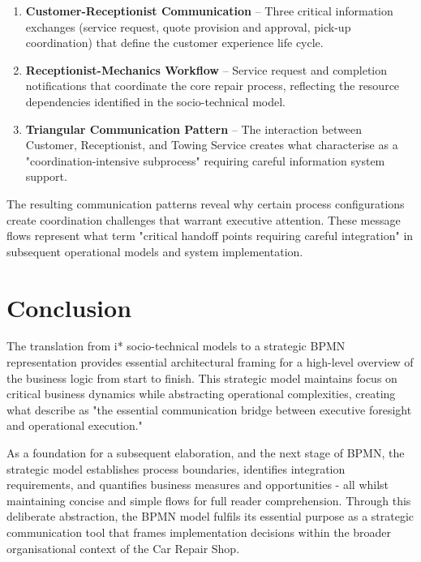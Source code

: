 \documentclass[14pt,a4paper]{article}
\begin{document}
\begin{enumerate}
    \item \textbf{Customer-Receptionist Communication} – Three critical information exchanges (service request, quote provision and approval, pick-up coordination) that define the customer experience life cycle.

    \item \textbf{Receptionist-Mechanics Workflow} – Service request and completion notifications that coordinate the core repair process, reflecting the resource dependencies identified in the socio-technical model.

    \item \textbf{Triangular Communication Pattern} – The interaction between Customer, Receptionist, and Towing Service creates what \textit{\parencite{Corradini2018}} characterise as a "coordination-intensive subprocess" requiring careful information system support.
\end{enumerate}

The resulting communication patterns reveal why certain process configurations create coordination challenges that warrant executive attention. These message flows represent what \textit{\parencite[p. 195]{Delgado2020}} term "critical handoff points requiring careful integration" in subsequent operational models and system implementation.

\section{Conclusion}

The translation from i* socio-technical models to a strategic BPMN representation provides essential architectural framing for a high-level overview of the business logic from start to finish. This strategic model maintains focus on critical business dynamics while abstracting operational complexities, creating what \textit{\parencite[p. 103]{Bosch2018}} describe as "the essential communication bridge between executive foresight and operational execution."

As a foundation for a subsequent elaboration, and the next stage of BPMN, the strategic model establishes process boundaries, identifies integration requirements, and quantifies business measures and opportunities - all whilst maintaining concise and simple flows for full reader comprehension. Through this deliberate abstraction, the BPMN model fulfils its essential purpose as a strategic communication tool that frames implementation decisions within the broader organisational context of the Car Repair Shop.

\newpage

\printbibliography
\end{document}
